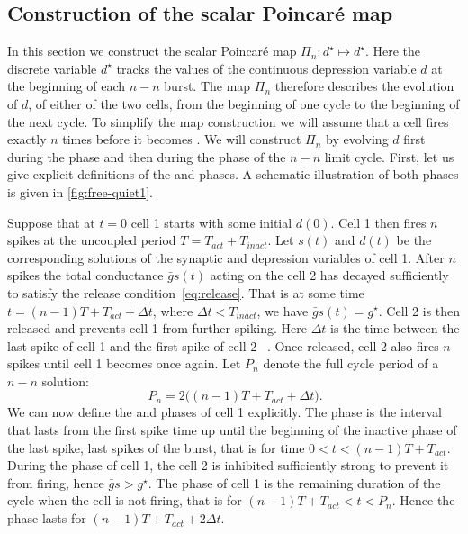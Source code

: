 \subsection{Construction of the scalar Poincaré map}
In this section we construct the scalar Poincaré map $\Pi_n:d^{\star}\mapsto d^{\star}$.
Here the discrete variable $d^{\star}$ tracks the values of the continuous depression variable $d$ at the beginning of each $n-n$ burst.
The map $\Pi_n$ therefore describes the evolution of $d$, of either of the two cells, from the beginning of one cycle to the beginning of the next cycle.
To simplify the map construction we will assume that a \free{} cell fires exactly $n$ times before it becomes \suppressed{}.
We will construct $\Pi_n$ by evolving $d$ first during the \free{} phase and then during the \suppressed{} phase of the $n-n$ limit cycle.
First, let us give explicit definitions of the \free{} and \suppressed{} phases.
A schematic illustration of both phases is given in \cref{fig:free-quiet1}.

Suppose that at $t=0$ cell 1 starts \free{} with some initial $d(0)$. Cell 1 then fires $n$ spikes at the uncoupled period $T=T_{act}+T_{inact}$.
Let $s(t)$ and $d(t)$ be the corresponding solutions of the synaptic and depression variables of cell 1.
After $n$ spikes the total conductance $\bar g s(t)$ acting on the \suppressed{} cell 2 has decayed sufficiently to satisfy the release condition~\eqref{eq:release}.
That is at some time $t=(n-1)T + T_{act} + \Delta t$, where $\Delta t < T_{inact}$, we have $\bar g s(t)=g^{\star}$.
Cell 2 is then released and prevents cell 1 from further spiking.
Here $\Delta t$ is the time between the last spike of cell 1 and the first spike of cell 2 ~\citep{bose2011}.
Once released, cell 2 also fires $n$ spikes until cell 1 becomes \free{} once again.
Let $P_n$ denote the full cycle period of a $n-n$ solution:
\begin{equation}
	~\label{eq:P}
	P_n = 2\Big( (n-1)T + T_{act} + \Delta t \Big).
\end{equation}
We can now define the \free{} and \suppressed{} phases of cell 1 explicitly.
The \free{} phase is the interval that lasts from the first spike time up until the beginning of the inactive phase of the last spike, last spikes of the burst, that is for time $0<t<(n-1)T + T_{act}$.
During the \free{} phase of cell 1, the \suppressed{} cell 2 is inhibited sufficiently strong to prevent it from firing, hence $\bar g s > g^{\star}$.
The \suppressed{} phase of cell 1 is the remaining duration of the cycle when the cell is not firing, that is for $(n-1)T + T_{act} < t < P_n$.
Hence the \suppressed{} phase lasts for $(n-1)T + T_{act} + 2\Delta t$.

